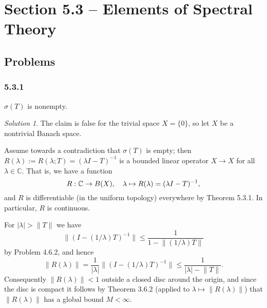 \documentclass{report}
\newcommand{\bb}[1]{\mathbb{#1}}
\newcommand{\norm}[1]{{\lVert #1 \rVert}}
\let\sc\relax
\newcommand{\sc}[1]{\mathscr{#1}}
\theoremstyle{remark}
\newtheorem*{solution}{Solution}
\begin{document}
\section*{Section 5.3 -- Elements of Spectral Theory}

\subsection*{Problems}

\subsubsection*{5.3.1}
$\sigma(T)$ is nonempty.

\begin{solution}
  The claim is false for the trivial space $X = \{0\}$, so let $X$ be a nontrivial Banach space.

  Assume towards a contradiction that $\sigma(T)$ is empty; then $R(\lambda) := R(\lambda; T) = (\lambda I - T)^{-1}$ is a bounded linear operator $X \to X$ for all $\lambda \in \bb C$. That is, we have a function
  \begin{equation*}
    R: \bb C \to \sc B(X), \quad \lambda \mapsto R(\lambda) = (\lambda I - T)^{-1},
  \end{equation*}
  and $R$ is differentiable (in the uniform topology) everywhere by Theorem 5.3.1. In particular, $R$ is continuous.

  For $|\lambda| > \norm T$ we have
  \begin{equation*}
    \norm{(I - (1/\lambda)T)^{-1}} \le \frac{1}{1 - \norm{(1/\lambda) T}}
  \end{equation*}
  by Problem 4.6.2, and hence
  \begin{equation*}
    \norm{R(\lambda)} = \frac{1}{|\lambda|} \norm{(I - (1/\lambda)T)^{-1}} \le \frac{1}{|\lambda| - \norm{T}}.
  \end{equation*}
  Consequently $\norm{R(\lambda)} < 1$ outside a closed disc around the origin, and since the disc is compact it follows by Theorem 3.6.2 (applied to $\lambda \mapsto \norm{R(\lambda)}$) that $\norm{R(\lambda)}$ has a global bound $M < \infty$.


\end{solution}
\end{document}
